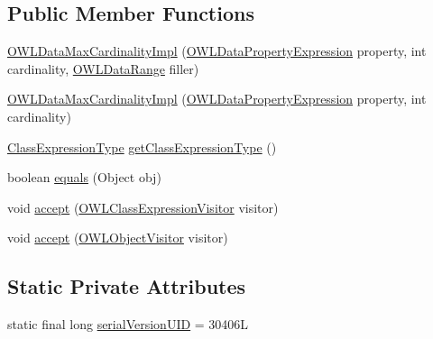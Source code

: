 \subsection*{Public Member Functions}
\begin{DoxyCompactItemize}
\item 
\hyperlink{classuk_1_1ac_1_1manchester_1_1cs_1_1owl_1_1owlapi_1_1_o_w_l_data_max_cardinality_impl_ad587f56a4379deb57a44d221e6d41fce}{O\-W\-L\-Data\-Max\-Cardinality\-Impl} (\hyperlink{interfaceorg_1_1semanticweb_1_1owlapi_1_1model_1_1_o_w_l_data_property_expression}{O\-W\-L\-Data\-Property\-Expression} property, int cardinality, \hyperlink{interfaceorg_1_1semanticweb_1_1owlapi_1_1model_1_1_o_w_l_data_range}{O\-W\-L\-Data\-Range} filler)
\item 
\hyperlink{classuk_1_1ac_1_1manchester_1_1cs_1_1owl_1_1owlapi_1_1_o_w_l_data_max_cardinality_impl_ae3aef393c662a0f4a6be9b985c0f12ec}{O\-W\-L\-Data\-Max\-Cardinality\-Impl} (\hyperlink{interfaceorg_1_1semanticweb_1_1owlapi_1_1model_1_1_o_w_l_data_property_expression}{O\-W\-L\-Data\-Property\-Expression} property, int cardinality)
\item 
\hyperlink{enumorg_1_1semanticweb_1_1owlapi_1_1model_1_1_class_expression_type}{Class\-Expression\-Type} \hyperlink{classuk_1_1ac_1_1manchester_1_1cs_1_1owl_1_1owlapi_1_1_o_w_l_data_max_cardinality_impl_a5bf22bde043e6b0d88e9a8c1239a9fc2}{get\-Class\-Expression\-Type} ()
\item 
boolean \hyperlink{classuk_1_1ac_1_1manchester_1_1cs_1_1owl_1_1owlapi_1_1_o_w_l_data_max_cardinality_impl_abf452da78a06f6175bb3cb3bb81322f8}{equals} (Object obj)
\item 
void \hyperlink{classuk_1_1ac_1_1manchester_1_1cs_1_1owl_1_1owlapi_1_1_o_w_l_data_max_cardinality_impl_a17076670ad09410211b35b365b005e0b}{accept} (\hyperlink{interfaceorg_1_1semanticweb_1_1owlapi_1_1model_1_1_o_w_l_class_expression_visitor}{O\-W\-L\-Class\-Expression\-Visitor} visitor)
\item 
void \hyperlink{classuk_1_1ac_1_1manchester_1_1cs_1_1owl_1_1owlapi_1_1_o_w_l_data_max_cardinality_impl_ac60ea2537da600a97ef2b2e64e17d828}{accept} (\hyperlink{interfaceorg_1_1semanticweb_1_1owlapi_1_1model_1_1_o_w_l_object_visitor}{O\-W\-L\-Object\-Visitor} visitor)
\end{DoxyCompactItemize}
\subsection*{Static Private Attributes}
\begin{DoxyCompactItemize}
\item 
static final long \hyperlink{classuk_1_1ac_1_1manchester_1_1cs_1_1owl_1_1owlapi_1_1_o_w_l_data_max_cardinality_impl_a333a5186ed9808be946d46b31c34e30c}{serial\-Version\-U\-I\-D} = 30406\-L
\end{DoxyCompactItemize}
